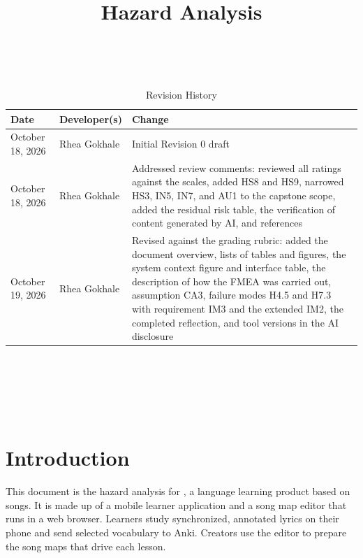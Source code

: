 \documentclass{article}
\title{Hazard Analysis\\\progname}
\author{\authname}
\date{}
\begin{document}
\maketitle
\thispagestyle{empty}

~\newpage


\begin{table}[hp]
\caption{Revision History} \label{TblRevisionHistory}
\begin{tabularx}{\textwidth}{llX}
\toprule
\textbf{Date} & \textbf{Developer(s)} & \textbf{Change}\\
\midrule
October 18, 2026 & Rhea Gokhale & Initial Revision 0 draft\\
October 18, 2026 & Rhea Gokhale & Addressed review comments: reviewed all
ratings against the scales, added HS8 and HS9, narrowed HS3, IN5, IN7, and AU1
to the capstone scope, added the residual risk table, the verification of
content generated by AI, and references\\
October 19, 2026 & Rhea Gokhale & Revised against the grading rubric: added
the document overview, lists of tables and figures, the system context figure
and interface table, the description of how the FMEA was carried out,
assumption CA3, failure modes H4.5 and H7.3 with requirement IM3 and the
extended IM2, the completed reflection, and tool versions in the AI
disclosure\\
\bottomrule
\end{tabularx}
\end{table}

~\newpage

\tableofcontents

~\newpage

\listoftables

\listoffigures

~\newpage


\section{Introduction}

This document is the hazard analysis for \progname{}, a language learning product based on songs. It is made up of a mobile learner application and a song map editor that runs in a web browser. Learners study synchronized, annotated lyrics on
their phone and send selected vocabulary to Anki. Creators use the editor to
prepare the song maps that drive each lesson.
\end{document}

